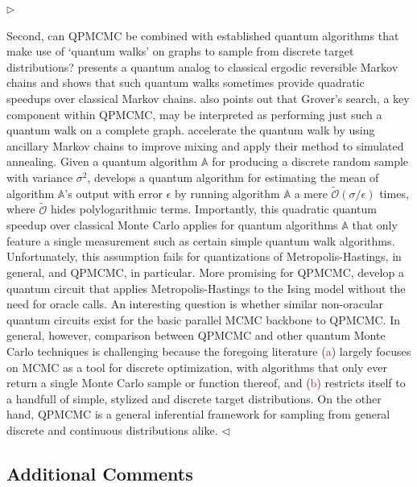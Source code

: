\documentclass[12pt]{article}
\newenvironment{reply}{$\triangleright$\bfseries}{$\triangleleft$}
\renewenvironment{quote}
               {\list{}{\rightmargin\leftmargin}%
                \item\relax\normalfont}
               {\endlist}
\begin{document}
\begin{reply}
\begin{quote}
Second, can QPMCMC be combined with established quantum algorithms that make use of `quantum walks' on graphs to sample from discrete target distributions?  \citet{szegedy2004quantum} presents a quantum analog to classical ergodic reversible Markov chains and shows that such quantum walks sometimes provide quadratic speedups over classical Markov chains.  \citet{szegedy2004quantum} also points out that Grover's search, a key component within QPMCMC, may be interpreted as performing just such a quantum walk on a complete graph.  \citet{wocjan2008speedup} accelerate the quantum walk by using ancillary Markov chains to improve mixing and apply their method to simulated annealing.  Given a quantum algorithm $\mathbb{A}$ for producing a discrete random sample with variance $\sigma^2$, \citet{montanaro} develops a quantum algorithm for estimating the mean of algorithm $\mathbb{A}$'s output with error $\epsilon$ by running algorithm $\mathbb{A}$ a mere $\widetilde{\mathcal{O}}(\sigma/\epsilon)$ times, where $\widetilde{\mathcal{O}}$ hides polylogarithmic terms. Importantly, this quadratic quantum speedup over classical Monte Carlo applies for quantum algorithms $\mathbb{A}$ that only feature a single measurement such as certain simple quantum walk algorithms. Unfortunately, this assumption fails for quantizations of Metropolis-Hastings, in general, and QPMCMC, in particular. More promising for QPMCMC, \citet{lemieux2020efficient} develop a quantum circuit that applies Metropolis-Hastings to the Ising model without the need for oracle calls.  An interesting question is whether similar non-oracular quantum circuits exist for the basic parallel MCMC backbone to QPMCMC.  In general, however, comparison between QPMCMC and other quantum Monte Carlo techniques is challenging because the foregoing literature (\textcolor{red}{a}) largely focuses on MCMC as a tool for discrete optimization, with algorithms that only ever return a single Monte Carlo sample or function thereof, and (\textcolor{red}{b}) restricts itself to a handfull of simple, stylized and discrete target distributions.  On the other hand, QPMCMC is a general inferential framework for sampling from general discrete and continuous distributions alike.
	\end{quote}
\end{reply}

\subsection*{Additional Comments}
\end{document}
